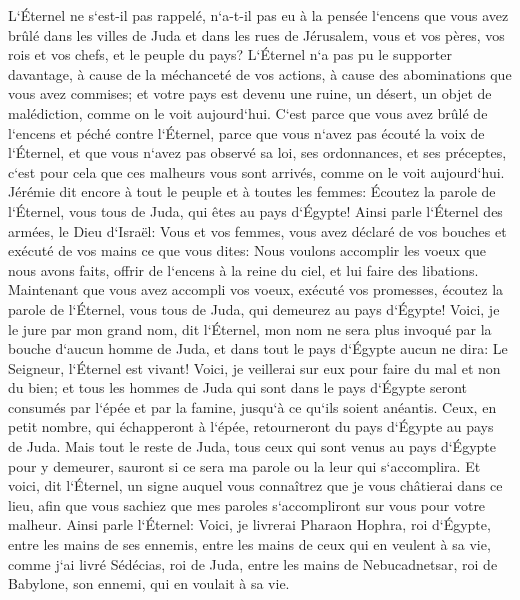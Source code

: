 \verse L`Éternel ne s`est-il pas rappelé, n`a-t-il pas eu à la pensée l`encens que vous avez brûlé dans les villes de Juda et dans les rues de Jérusalem, vous et vos pères, vos rois et vos chefs, et le peuple du pays? 
\verse L`Éternel n`a pas pu le supporter davantage, à cause de la méchanceté de vos actions, à cause des abominations que vous avez commises; et votre pays est devenu une ruine, un désert, un objet de malédiction, comme on le voit aujourd`hui. 
\verse C`est parce que vous avez brûlé de l`encens et péché contre l`Éternel, parce que vous n`avez pas écouté la voix de l`Éternel, et que vous n`avez pas observé sa loi, ses ordonnances, et ses préceptes, c`est pour cela que ces malheurs vous sont arrivés, comme on le voit aujourd`hui. 
\verse Jérémie dit encore à tout le peuple et à toutes les femmes: Écoutez la parole de l`Éternel, vous tous de Juda, qui êtes au pays d`Égypte! 
\verse Ainsi parle l`Éternel des armées, le Dieu d`Israël: Vous et vos femmes, vous avez déclaré de vos bouches et exécuté de vos mains ce que vous dites: Nous voulons accomplir les voeux que nous avons faits, offrir de l`encens à la reine du ciel, et lui faire des libations. Maintenant que vous avez accompli vos voeux, exécuté vos promesses, 
\verse écoutez la parole de l`Éternel, vous tous de Juda, qui demeurez au pays d`Égypte! Voici, je le jure par mon grand nom, dit l`Éternel, mon nom ne sera plus invoqué par la bouche d`aucun homme de Juda, et dans tout le pays d`Égypte aucun ne dira: Le Seigneur, l`Éternel est vivant! 
\verse Voici, je veillerai sur eux pour faire du mal et non du bien; et tous les hommes de Juda qui sont dans le pays d`Égypte seront consumés par l`épée et par la famine, jusqu`à ce qu`ils soient anéantis. 
\verse Ceux, en petit nombre, qui échapperont à l`épée, retourneront du pays d`Égypte au pays de Juda. Mais tout le reste de Juda, tous ceux qui sont venus au pays d`Égypte pour y demeurer, sauront si ce sera ma parole ou la leur qui s`accomplira. 
\verse Et voici, dit l`Éternel, un signe auquel vous connaîtrez que je vous châtierai dans ce lieu, afin que vous sachiez que mes paroles s`accompliront sur vous pour votre malheur. 
\verse Ainsi parle l`Éternel: Voici, je livrerai Pharaon Hophra, roi d`Égypte, entre les mains de ses ennemis, entre les mains de ceux qui en veulent à sa vie, comme j`ai livré Sédécias, roi de Juda, entre les mains de Nebucadnetsar, roi de Babylone, son ennemi, qui en voulait à sa vie. 

